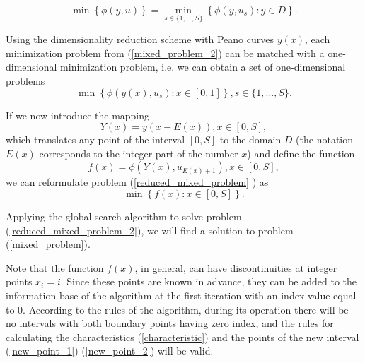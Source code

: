 \documentclass[runningheads]{llncs}
\begin{document}
\begin{equation}\label{mixed_problem_2} 
 \min \left\{\phi(y, u)\right\} = \min_{s \in \{1, ..., S\}} \left\{\phi(y, u_s): y \in D\right\}.
\end{equation}

Using the dimensionality reduction scheme with Peano curves $y(x)$, each minimization problem from (\ref{mixed_problem_2}) can be matched with a one-dimensional minimization problem, i.e. we can obtain a set of one-dimensional problems
\begin{equation}\label{reduced_mixed_problem} 
 \min \left\{\phi(y(x), u_s): x \in [0,1]\right\}, s \in \{1, ..., S\}.
\end{equation}

If we now introduce the mapping
\[
Y(x) = y(x-E(x)), x \in [0, S],
\]
which translates any point of the interval $[0,S]$ to the domain $D$ (the notation $E(x)$ corresponds to the integer part of the number $x$) and define the function
\[
f(x)=\phi(Y(x), u_{E(x) + 1}), x \in [0, S],
\]
we can reformulate problem (\ref{reduced_mixed_problem} ) as
\begin{equation}\label{reduced_mixed_problem_2} 
 \min \left\{f(x): x \in [0,S]\right\}.
\end{equation}

Applying the global search algorithm to solve problem (\ref{reduced_mixed_problem_2}), we will find a solution to problem (\ref{mixed_problem}). 

Note that the function $f(x)$, in general, can have discontinuities at integer points $x_i=i$. Since these points are known in advance, they can be added to the information base of the algorithm at the first iteration with an index value equal to $0$. According to the rules of the algorithm, during its operation there will be no intervals with both boundary points having zero index, and the rules for calculating the characteristics (\ref{characteristic}) and the points of the new interval (\ref{new_point_1})-(\ref{new_point_2}) will be valid.
\end{document}
